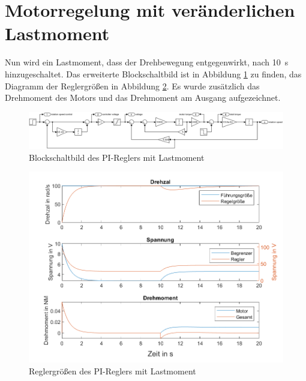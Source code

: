 \documentclass[
    paper=a4,
    fontsize=10pt,
    DIV=12,
    oneside,
]{scrartcl}
\begin{document}
\section{Motorregelung mit veränderlichen Lastmoment}
    Nun wird ein Lastmoment, dass der Drehbewegung entgegenwirkt, nach \SI{10}{\second} hinzugeschaltet. Das erweiterte Blockschaltbild ist in Abbildung \ref{fig:blockPiControllerLoad} zu finden, das Diagramm der Reglergrößen in Abbildung \ref{fig:graphPiControllerload}. Es wurde zusätzlich das Drehmoment des Motors und das Drehmoment am Ausgang aufgezeichnet.

    \begin{figure}[hbt]
        \centering
        \includegraphics[width=1.7\imagewidth]{../versuch3/blockPiControllerLoad}
        \caption{Blockschaltbild des PI-Reglers mit Lastmoment}
        \label{fig:blockPiControllerLoad}
    \end{figure}

    \begin{figure}[hbt]
        \centering
        \includegraphics[width=1.3\imagewidth]{../versuch3/graphPiControllerLoad}
        \caption{Reglergrößen des PI-Reglers mit Lastmoment}
        \label{fig:graphPiControllerload}
    \end{figure}  

\end{document}
